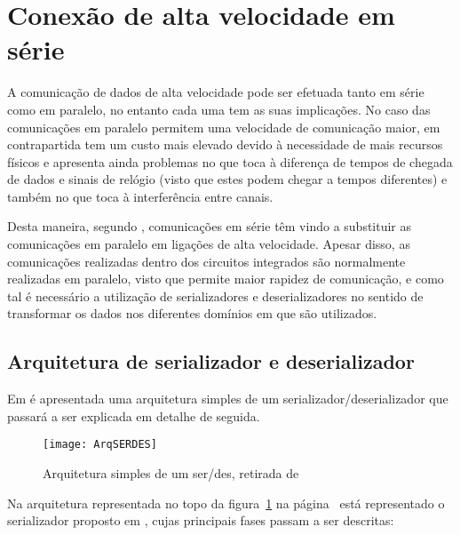 \section{Conexão de alta velocidade em série} \label{sec:conexaoSerie}
A comunicação de dados de alta velocidade pode ser efetuada tanto em série como em paralelo, no entanto cada uma tem as suas implicações. No caso das comunicações em paralelo permitem uma velocidade de comunicação maior, em contrapartida tem um custo mais elevado devido à necessidade de mais recursos físicos e apresenta ainda problemas no que toca à diferença de tempos de chegada de dados e sinais de relógio (visto que estes podem chegar a tempos diferentes) e também no que toca à interferência entre canais. 

Desta maneira, segundo \cite{R012}, comunicações em série têm vindo a substituir as comunicações em paralelo em ligações de alta velocidade. Apesar disso, as comunicações realizadas dentro dos circuitos integrados são normalmente realizadas em paralelo, visto que permite maior rapidez de comunicação, e como tal é necessário a utilização de serializadores e deserializadores no sentido de transformar os dados nos diferentes domínios em que são utilizados.

\subsection{Arquitetura de serializador e deserializador}

Em \cite{R012} é apresentada uma arquitetura simples de um serializador/deserializador que passará a ser explicada em detalhe de seguida.

\begin{figure}[h!]
	\begin{center}
		\leavevmode
		\texttt{[image: ArqSERDES]}
		\caption{Arquitetura simples de um ser/des, retirada de \cite{R012}}
		\label{fig:arquiteturaSERDES}
	\end{center}
\end{figure}

Na arquitetura representada no topo da figura~\ref{fig:arquiteturaSERDES} na página~\pageref{fig:arquiteturaSERDES} está representado o serializador proposto em \cite{R012}, cujas principais fases passam a ser descritas:

